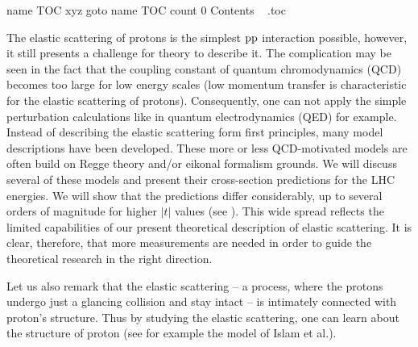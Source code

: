 \def\InsertToc{%
	\vfil\eject\forceoddpage\vskip3cm%
	\def\currentChapterName{Contents} \def\currentPartName{}%
	\pdfdest name {TOC} xyz
	\pdfoutline goto name {TOC} count 0 {\currentChapterName}%
	\hbox{%
		\vtop{%
			\noindent
			\fchapter Contents
		}%
	}%
	\vskip1\baselineskip
	\jobname.toc
}


\InsertToc

\vfill\eject


\BeginText


The elastic scattering of protons is the simplest $\rm pp$ interaction possible, however, it still presents a challenge for theory to describe it. The complication may be seen in the fact that the coupling constant of quantum chromodynamics (QCD) becomes too large for low energy scales (low momentum transfer is characteristic for the elastic scattering of protons). Consequently, one can not apply the simple perturbation calculations like in quantum electrodynamics (QED) for example. Instead of describing the elastic scattering form first principles, many model descriptions have been developed. These more or less QCD-motivated models are often build on Regge theory and/or eikonal formalism grounds. We will discuss several of these models and present their  cross-section predictions for the LHC energies. We will show that the predictions differ considerably, up to several orders of magnitude for higher $|t|$ values (see ). This wide spread reflects the limited capabilities of our present theoretical description of elastic scattering. It is clear, therefore, that more measurements are needed in order to guide the theoretical research in the right direction.

Let us also remark that the elastic scattering -- a process, where the protons undergo just a glancing collision and stay intact -- is intimately connected with proton's structure. Thus by studying the elastic scattering, one can learn about the structure of proton (see for example the model of Islam et al.).

